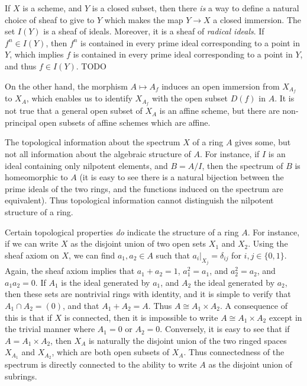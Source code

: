 If $X$ is a scheme, and $Y$ is a closed subset, then there \emph{is} a way to define a natural choice of sheaf to give to $Y$ which makes the map $Y \to X$ a closed immersion. The set $I(Y)$ is a sheaf of ideals. Moreover, it is a sheaf of \emph{radical ideals}. If $f^n \in I(Y)$, then $f^n$ is contained in every prime ideal corresponding to a point in $Y$, which implies $f$ is contained in every prime ideal corresponding to a point in $Y$, and thus $f \in I(Y)$. TODO

On the other hand, the morphism $A \mapsto A_f$ induces an open immersion from $X_{A_f}$ to $X_A$, which enables us to identify $X_{A_f}$ with the open subset $D(f)$ in $A$. It is not true that a general open subset of $X_A$ is an affine scheme, but there are non-principal open subsets of affine schemes which are affine.

The topological information about the spectrum $X$ of a ring $A$ gives some, but not all information about the algebraic structure of $A$. For instance, if $I$ is an ideal containing only nilpotent elements, and $B = A/I$, then the spectrum of $B$ is homeomorphic to $A$ (it is easy to see there is a natural bijection between the prime ideals of the two rings, and the functions induced on the spectrum are equivalent). Thus topological information cannot distinguish the nilpotent structure of a ring.

Certain topological properties \emph{do} indicate the structure of a ring $A$. For instance, if we can write $X$ as the disjoint union of two open sets $X_1$ and $X_2$. Using the sheaf axiom on $X$, we can find $a_1,a_2 \in A$ such that $a_i|_{X_j} = \delta_{ij}$ for $i,j \in \{ 0, 1 \}$. Again, the sheaf axiom implies that $a_1 + a_2 = 1$, $a_1^2 = a_1$, and $a_2^2 = a_2$, and $a_1a_2 = 0$. If $A_1$ is the ideal generated by $a_1$, and $A_2$ the ideal generated by $a_2$, then these sets are nontrivial rings with identity, and it is simple to verify that $A_1 \cap A_2 = (0)$, and that $A_1 + A_2 = A$. Thus $A \cong A_1 \times A_2$. A consequence of this is that if $X$ is connected, then it is impossible to write $A \cong A_1 \times A_2$ except in the trivial manner where $A_1 = 0$ or $A_2 = 0$. Conversely, it is easy to see that if $A = A_1 \times A_2$, then $X_A$ is naturally the disjoint union of the two ringed spaces $X_{A_1}$ and $X_{A_2}$, which are both open subsets of $X_A$. Thus connectedness of the spectrum is directly connected to the ability to write $A$ as the disjoint union of subrings.

